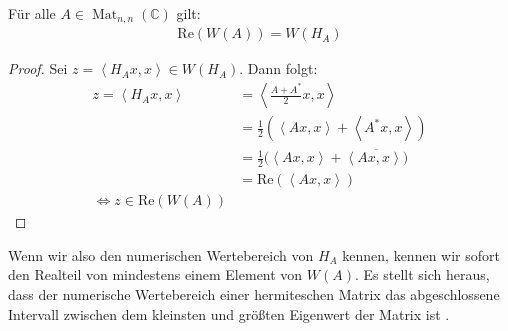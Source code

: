 \begin{lem} \label{lem:nr_real_matrix}
	Für alle $A \in \operatorname{Mat}_{n,n}(\mathbb{C})$ gilt: \begin{align*}
		\mathrm{Re} (W(A)) = W(H_A)
	\end{align*}
\end{lem}
\begin{proof}
	Sei $z=\left< H_Ax,x \right> \in W(H_A)$. Dann folgt: \begin{align*}
		z =\left< H_Ax,x \right> &= \left< \frac{A+A^*}{2} x,x \right> \\
		&= \frac{1}{2} ( \left< Ax,x \right> + \left< A^*x,x \right> ) \\ 
		&= \frac{1}{2} ( \left< Ax,x \right> + \overline{ \left< Ax,x \right> ) } \\ 
		&= \mathrm{Re}(\left< Ax,x \right>) \\
		\iff z \in \mathrm{Re}(W(A))
	\end{align*}
\end{proof}

Wenn wir also den numerischen Wertebereich von $H_A$ kennen, kennen wir sofort den Realteil von mindestens einem Element von $W(A)$. Es stellt sich heraus, dass der numerische Wertebereich einer hermiteschen Matrix das abgeschlossene Intervall zwischen dem kleinsten und größten Eigenwert der Matrix ist \cite[vgl. ][]{johnson1978numerical, cowen1995effective}.

